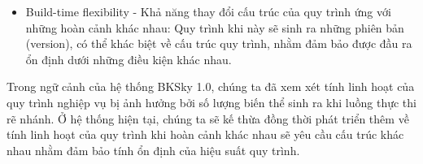 \begin{enumerate}[label=(\alph*)]
\begin{itemize}
        \item Build-time flexibility - Khả năng thay đổi cấu trúc của quy trình ứng với những hoàn cảnh khác nhau: Quy trình khi này sẽ sinh ra những phiên bản (version), có thể khác biệt về cấu trúc quy trình, nhằm đảm bảo được đầu ra ổn định dưới những điều kiện khác nhau.
    \end{itemize}

Trong ngữ cảnh của hệ thống BKSky 1.0, chúng ta đã xem xét tính linh hoạt của quy trình nghiệp vụ bị ảnh hưởng bởi số lượng biến thể sinh ra khi luồng thực thi rẽ nhánh. Ở hệ thống hiện tại, chúng ta sẽ kế thừa đồng thời phát triển thêm về tính linh hoạt của quy trình khi hoàn cảnh khác nhau sẽ yêu cầu cấu trúc khác nhau nhằm đảm bảo tính ổn định của hiệu suất quy trình. 
\end{enumerate}